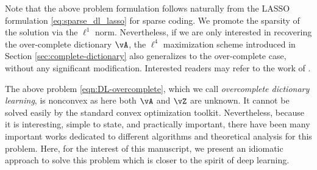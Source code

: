 \documentclass[../../book-main.tex]{subfiles}
\begin{document}
\begin{remark}
Note that the above problem formulation follows naturally from the LASSO
    formulation \eqref{eq:sparse_dl_lasso} for sparse coding. We promote the
    sparsity of the solution via the \(\ell^1\) norm. Nevertheless, if we are only interested in recovering the over-complete dictionary \(\vA\), the \(\ell^4\) maximization scheme introduced in Section \ref{sec:complete-dictionary} also generalizes to the over-complete case, without any significant modification. Interested readers may refer to the work of \cite{Qu2020Geometric}. 
\end{remark}

The above problem \eqref{eqn:DL-overcomplete}, which we call
\textit{overcomplete dictionary learning}, is nonconvex as here both \(\vA\) and
\(\vZ\) are unknown. It cannot be solved easily by the standard convex
optimization toolkit. Nevertheless, because it is interesting, simple to state,
and practically important, there have been many important works dedicated to
different algorithms and theoretical analysis for this problem. Here, for the
interest of this manuscript, we present an idiomatic approach to solve this problem
which is closer to the spirit of deep learning.
\end{document}
